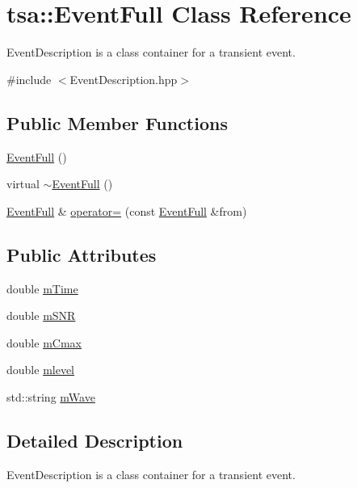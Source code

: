 \hypertarget{classtsa_1_1_event_full}{}\section{tsa\+:\+:Event\+Full Class Reference}
\label{classtsa_1_1_event_full}


Event\+Description is a class container for a transient event.  




{\ttfamily \#include $<$Event\+Description.\+hpp$>$}

\subsection*{Public Member Functions}
\begin{DoxyCompactItemize}
\item 
\hyperlink{classtsa_1_1_event_full_a393a0a4f3d8645e428e1fa859ee6e27b}{Event\+Full} ()
\item 
virtual \hyperlink{classtsa_1_1_event_full_a4f581518368d444de09bedaff348cf15}{$\sim$\+Event\+Full} ()
\item 
\hyperlink{classtsa_1_1_event_full}{Event\+Full} \& \hyperlink{classtsa_1_1_event_full_a94cac0a4cea4fc0650ee189717efaf62}{operator=} (const \hyperlink{classtsa_1_1_event_full}{Event\+Full} \&from)
\end{DoxyCompactItemize}
\subsection*{Public Attributes}
\begin{DoxyCompactItemize}
\item 
double \hyperlink{classtsa_1_1_event_full_afb3f24f8886fd72902f3c24a18c4fac5}{m\+Time}
\item 
double \hyperlink{classtsa_1_1_event_full_a1cfa881637a706ed70a27cabfa5d8039}{m\+S\+NR}
\item 
double \hyperlink{classtsa_1_1_event_full_a8abbd6e97b23d2c69bc57fa4c055e8ec}{m\+Cmax}
\item 
double \hyperlink{classtsa_1_1_event_full_a29245bb8db5f94ca1cb6559b55e741c3}{mlevel}
\item 
std\+::string \hyperlink{classtsa_1_1_event_full_a3edd346809a57862f998d60b566320b4}{m\+Wave}
\end{DoxyCompactItemize}


\subsection{Detailed Description}
Event\+Description is a class container for a transient event. 

